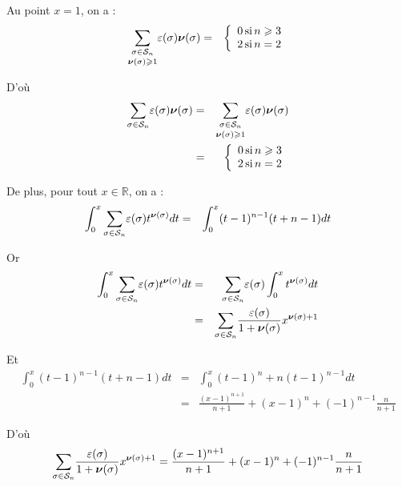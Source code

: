 Au point $x = 1$, on a :
\begin{eqnarray*}
  \underset{\boldsymbol{\nu} (\sigma) \geqslant 1}{\underset{\sigma \in
  \mathcal{S}_n}{\sum}} \varepsilon (\sigma) \boldsymbol{\nu} (\sigma) & = &
  \left\{\begin{array}{l}
    0 \operatorname{si} n \geqslant 3\\
    2 \operatorname{si} n = 2
  \end{array}\right.
\end{eqnarray*}


D'o{\`u}
\begin{eqnarray*}
  \underset{\sigma \in \mathcal{S}_n}{\sum} \varepsilon (\sigma)
  \boldsymbol{\nu} (\sigma) & = & \underset{\boldsymbol{\nu} (\sigma) \geqslant
  1}{\underset{\sigma \in \mathcal{S}_n}{\sum}} \varepsilon (\sigma)
  \boldsymbol{\nu} (\sigma)\\
  & = & \left\{\begin{array}{l}
    0 \operatorname{si} n \geqslant 3\\
    2 \operatorname{si} n = 2
  \end{array}\right.
\end{eqnarray*}


De plus, pour tout $x \in \mathbb{R}$, on a :
\begin{eqnarray*}
  \int^x_0 \underset{\sigma \in \mathcal{S}_n}{\sum} \varepsilon (\sigma)
  t^{\boldsymbol{\nu} (\sigma)} d t & = & \int^x_0 (t - 1)^{n - 1} (t + n - 1) d
  t
\end{eqnarray*}


Or
\begin{eqnarray*}
  \int^x_0 \underset{\sigma \in \mathcal{S}_n}{\sum} \varepsilon (\sigma)
  t^{\boldsymbol{\nu} (\sigma)} d t & = & \underset{\sigma \in
  \mathcal{S}_n}{\sum} \varepsilon (\sigma) \int^x_0 t^{\boldsymbol{\nu}
  (\sigma)} d t\\
  & = & \underset{\sigma \in \mathcal{S}_n}{\sum} \frac{\varepsilon
  (\sigma)}{1 +\boldsymbol{\nu} (\sigma)} x^{\boldsymbol{\nu} (\sigma) + 1}
\end{eqnarray*}


Et
\begin{eqnarray*}
  \int^x_0 (t - 1)^{n - 1} (t + n - 1) d t & = & \int^x_0 (t - 1)^n + n (t -
  1)^{n - 1} d t\\
  & = & \frac{(x - 1)^{n + 1}}{n + 1} + (x - 1)^n + (- 1)^{n - 1} \frac{n}{n
  + 1}
\end{eqnarray*}


D'o{\`u}
\[ \underset{\sigma \in \mathcal{S}_n}{\sum} \frac{\varepsilon (\sigma)}{1
   +\boldsymbol{\nu} (\sigma)} x^{\boldsymbol{\nu} (\sigma) + 1} = \frac{(x -
   1)^{n + 1}}{n + 1} + (x - 1)^n + (- 1)^{n - 1} \frac{n}{n + 1} \]


